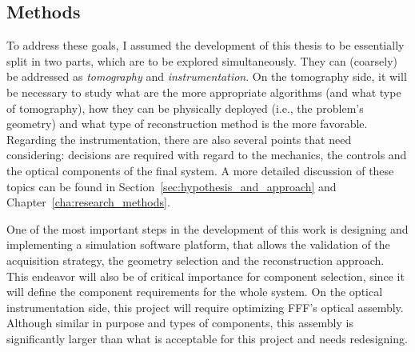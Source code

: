 \subsection{Methods}%
\label{sub:methods}

To address these goals, I assumed the development of this thesis to be
essentially split in two parts, which are to be explored simultaneously.
They can (coarsely) be addressed as \emph{tomography} and
\emph{instrumentation}. On the tomography side, it will be necessary to
study what are the more appropriate algorithms (and what type of
tomography), how they can be physically deployed (i.e., the problem's
geometry) and what type of reconstruction method is the more favorable.
Regarding the instrumentation, there are also several points that need
considering: decisions are required with regard to the mechanics, the
controls and the optical components of the final system. A more detailed
discussion of these topics can be found in
Section~\ref{sec:hypothesis_and_approach} and
Chapter~\ref{cha:research_methods}.

One of the most important steps in the development of this work is
designing and implementing a simulation software platform, that allows
the validation of the acquisition strategy, the geometry selection and
the reconstruction approach. This endeavor will also be of critical
importance for component selection, since it will define the component
requirements for the whole system. On the optical instrumentation side,
this project will require optimizing \gls{FFF}'s optical assembly.
Although similar in purpose and types of components, this assembly is
significantly larger than what is acceptable for this project and needs
redesigning.




